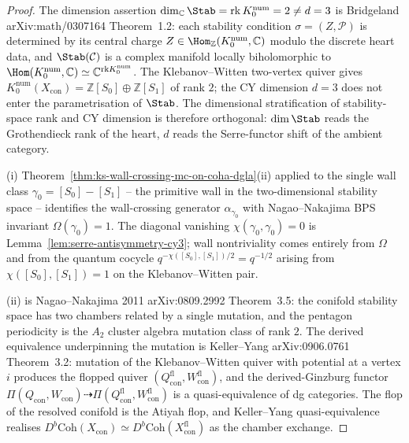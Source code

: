 \begin{proof}
The dimension assertion $\dim_{\mathbb{C}} \Stab =
\mathrm{rk}\, K_0^{\mathrm{num}} = 2 \neq d = 3$ is Bridgeland
\textup{arXiv:math/0307164} Theorem~1.2: each stability condition
$\sigma = (Z, \mathcal{P})$ is determined by its central charge $Z
\in \Hom_{\mathbb{Z}}(K_0^{\mathrm{num}}, \mathbb{C})$ modulo the
discrete heart data, and $\Stab(\mathcal{C})$ is a complex manifold
locally biholomorphic to $\Hom(K_0^{\mathrm{num}}, \mathbb{C}) \simeq
\mathbb{C}^{\mathrm{rk} K_0^{\mathrm{num}}}$. The
Klebanov--Witten two-vertex quiver gives $K_0^{\mathrm{num}}(
X_{\mathrm{con}}) = \mathbb{Z}[S_0] \oplus \mathbb{Z}[S_1]$ of rank
$2$; the CY dimension $d = 3$ does not enter the parametrisation of
$\Stab$. The dimensional stratification of stability-space rank and
CY dimension is therefore orthogonal: $\dim \Stab$ reads the
Grothendieck rank of the heart, $d$ reads the Serre-functor shift of
the ambient category.

(i) Theorem~\ref{thm:ks-wall-crossing-mc-on-coha-dgla}(ii) applied to
the single wall class $\gamma_0 = [S_0] - [S_1]$ -- the primitive
wall in the two-dimensional stability space -- identifies the
wall-crossing generator $\alpha_{\gamma_0}$ with Nagao--Nakajima BPS
invariant $\Omega(\gamma_0) = 1$. The diagonal vanishing
$\chi(\gamma_0, \gamma_0) = 0$ is
Lemma~\ref{lem:serre-antisymmetry-cy3}; wall nontriviality comes
entirely from $\Omega$ and from the quantum cocycle
$q^{-\chi([S_0], [S_1])/2} = q^{-1/2}$ arising from $\chi([S_0],
[S_1]) = 1$ on the Klebanov--Witten pair.

(ii) is Nagao--Nakajima 2011 \textup{arXiv:0809.2992} Theorem~3.5: the
conifold stability space has two chambers related by a single
mutation, and the pentagon periodicity is the $A_2$ cluster algebra
mutation class of rank $2$. The derived equivalence underpinning the
mutation is Keller--Yang \textup{arXiv:0906.0761} Theorem~3.2:
mutation of the Klebanov--Witten quiver with potential at a vertex
$i$ produces the flopped quiver $(Q^{\mathrm{fl}}_{\mathrm{con}},
W^{\mathrm{fl}}_{\mathrm{con}})$, and the derived-Ginzburg functor
$\Pi(Q_{\mathrm{con}}, W_{\mathrm{con}}) \dashrightarrow
\Pi(Q^{\mathrm{fl}}_{\mathrm{con}}, W^{\mathrm{fl}}_{\mathrm{con}})$
is a quasi-equivalence of dg categories. The flop of the resolved
conifold is the Atiyah flop, and Keller--Yang quasi-equivalence
realises $D^b\mathrm{Coh}(X_{\mathrm{con}}) \simeq
D^b\mathrm{Coh}(X^{\mathrm{fl}}_{\mathrm{con}})$ as the chamber
exchange.


\end{proof}
